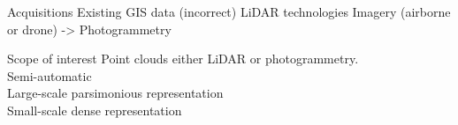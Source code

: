 \begin{frame}{Acquisitions}			
	Existing GIS data (incorrect)
	LiDAR technologies
	Imagery (airborne or drone) -> Photogrammetry
	
\end{frame}

\begin{frame}{Scope of interest}
	Point clouds either LiDAR or photogrammetry. \\
	Semi-automatic  \\
	Large-scale parsimonious representation \\
	Small-scale dense representation
\end{frame}